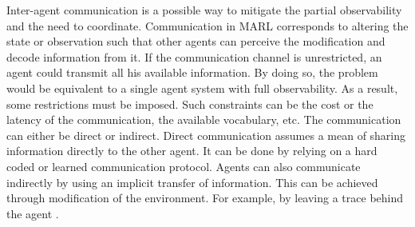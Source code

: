  

 
Inter-agent communication is a possible way to mitigate the partial observability and the need to coordinate. Communication in MARL corresponds to altering the state or observation such that other agents can perceive the modification and decode information from it. If the communication channel is unrestricted, an agent could transmit all his available information. By doing so, the problem would be equivalent to a single agent system with full observability. As a result, some restrictions must be imposed. Such constraints can be the cost or the latency of the communication, the available vocabulary, etc. The communication can either be direct or indirect. Direct communication assumes a mean of sharing information directly to the other agent. It can be done by relying on a hard coded or learned communication protocol. Agents can also communicate indirectly by using an implicit transfer of information. This can be achieved through modification of the environment. For example, by leaving a trace behind the agent \cite{panait_cooperative_2005}.

